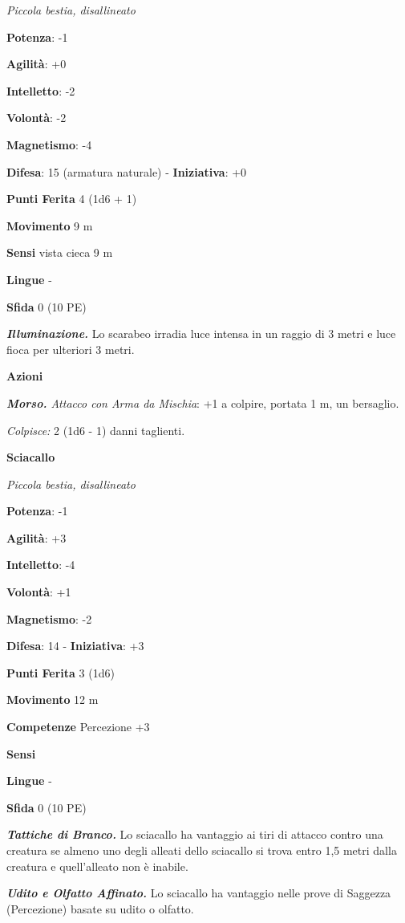 \begin{multicols}{2}
\emph{Piccola bestia, disallineato}

\textbf{Potenza}: -1

\textbf{Agilità}: +0

\textbf{Intelletto}: -2

\textbf{Volontà}: -2

\textbf{Magnetismo}: -4

\textbf{Difesa}: 15 (armatura naturale) - \textbf{Iniziativa}: +0

\textbf{Punti Ferita} 4 (1d6 + 1)

\textbf{Movimento} 9 m

\textbf{Sensi} vista cieca 9 m

\textbf{Lingue} -

\textbf{Sfida} 0 (10 PE)\smallskip

\emph{\textbf{Illuminazione.}} Lo scarabeo irradia luce intensa in un
raggio di 3 metri e luce fioca per ulteriori 3 metri.

\smallskip\textbf{Azioni}

\emph{\textbf{Morso.} Attacco con Arma da Mischia}: +1 a colpire,
portata 1 m, un bersaglio.

\emph{Colpisce:} 2 (1d6 - 1) danni taglienti.

\textbf{Sciacallo}

\emph{Piccola bestia, disallineato}

\textbf{Potenza}: -1

\textbf{Agilità}: +3

\textbf{Intelletto}: -4

\textbf{Volontà}: +1

\textbf{Magnetismo}: -2

\textbf{Difesa}: 14 - \textbf{Iniziativa}: +3

\textbf{Punti Ferita} 3 (1d6)

\textbf{Movimento} 12 m

\textbf{Competenze} Percezione +3

\textbf{Sensi} 

\textbf{Lingue} -

\textbf{Sfida} 0 (10 PE)\smallskip

\emph{\textbf{Tattiche di Branco.}} Lo sciacallo ha vantaggio ai tiri di
attacco contro una creatura se almeno uno degli alleati dello sciacallo
si trova entro 1,5 metri dalla creatura e quell'alleato non è inabile.

\emph{\textbf{Udito e Olfatto Affinato.}} Lo sciacallo ha vantaggio
nelle prove di Saggezza (Percezione) basate su udito o olfatto.


\end{multicols}
